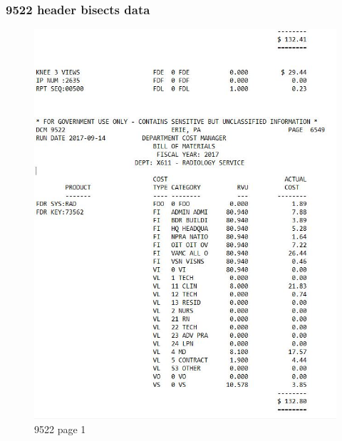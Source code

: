 \documentclass{beamer}\usepackage[]{graphicx}\usepackage[]{color}
\begin{document}
\begin{frame}[fragile]
  \frametitle{9522 header bisects data}
  
\begin{figure}
\includegraphics[scale=0.4]{9522_bisect}
\caption{9522 page 1}
\end{figure}
  
\end{frame}
\end{document}
